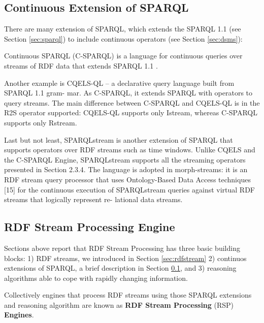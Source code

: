 \pagebreak
\subsection{Continuous Extension of SPARQL}\label{sec:continuous-sparql}

There are many extension of SPARQL, which extends the SPARQL 1.1 (see Section \ref{sec:sparql}) to include continuous operators (see Section \ref{sec:dsms}):

Continuous SPARQL (C-SPARQL)  is a language for continuous queries over streams of RDF data that extends SPARQL 1.1 \cite{Barbieri:2010:QRS:1860702.1860705}.

Another example is CQELS-QL \cite{Le-Phuoc:2011:NAA:2063016.2063041} – a declarative query language built from SPARQL 1.1 gram- mar. As C-SPARQL, it extends SPARQL with operators to query streams. The main difference between C-SPARQL and CQELS-QL is in the R2S operator supported: CQELS-QL supports only Istream, whereas C-SPARQL supports only Rstream. 

Last but not least, SPARQLstream \cite{Calbimonte:2010:EOA:1940281.1940289} is another extension of SPARQL that supports operators over RDF streams such as time windows. Unlike CQELS and the C-SPARQL Engine, SPARQLstream supports all the streaming operators presented in Section 2.3.4. The language is adopted in morph-streams: it is an RDF stream query processor that uses Ontology-Based Data Access techniques [15] for the continuous execution of SPARQLstream queries against virtual RDF streams that logically represent re- lational data streams.

\subsection{RDF Stream Processing Engine}\label{sec:rspengine}

Sections above report that RDF Stream Processing has three basic building blocks: 1) RDF streams, we introduced in Section \ref{sec:rdfstream} 2) continuos extensions of SPARQL, a brief description in Section \ref{sec:continuous-sparql}, and 3) reasoning algorithms able to cope with rapidly changing information.

Collectively engines that process RDF streams using those SPARQL extensions and reasoning algorithm are known as \textbf{RDF Stream Processing} (RSP) \textbf{Engines}.

